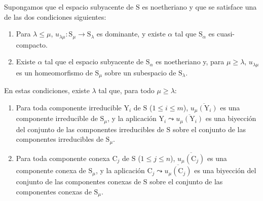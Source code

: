 \begin{proposition}[8.4.2]
\label{IV.8.4.2}
Supongamos que el espacio subyacente de $\mathrm{S}$ es noetheriano y que se satisface una de las dos condiciones siguientes:
\begin{enumerate}[label=\emph{\alph*)}]
  \item Para $\lambda\leqslant\mu$, $u_{\lambda\mu}:\mathrm{S}_\mu\to\mathrm{S}_\lambda$ es dominante, y existe $\alpha$ tal que $\mathrm{S}_\alpha$ es cuasi-compacto.
  \item Existe $\alpha$ tal que el espacio subyacente de $\mathrm{S}_\alpha$ es noetheriano y, para $\mu\geqslant\lambda$, $u_{\lambda\mu}$ es un homeomorfismo de $\mathrm{S}_\mu$ sobre un subespacio de $\mathrm{S}_\lambda$.
\end{enumerate}
En estas condiciones, existe $\lambda$ tal que, para todo $\mu\geqslant\lambda$:
\begin{enumerate}[label=(\roman*)]
  \item Para toda componente irreducible $\mathrm{Y}_i$ de $\mathrm{S}$ ($1\leqslant i\leqslant m$), $\overline{u_\mu(\mathrm{Y}_i)}$ es una componente irreducible de $\mathrm{S}_\mu$, y la aplicación $\mathrm{Y}_i\leadsto\overline{u_\mu(\mathrm{Y}_i)}$ es una biyección del conjunto de las componentes irreducibles de $\mathrm{S}$ sobre el conjunto de las componentes irreducibles de $\mathrm{S}_\mu$.
  \item Para toda componente conexa $\mathrm{C}_j$ de $\mathrm{S}$ ($1\leqslant j\leqslant n$), $\overline{u_\mu(\mathrm{C}_j)}$ es una componente conexa de $\mathrm{S}_\mu$, y la aplicación $\mathrm{C}_j\leadsto\overline{u_\mu(\mathrm{C}_j)}$ es una biyección del conjunto de las componentes conexas de $\mathrm{S}$ sobre el conjunto de las componentes conexas de $\mathrm{S}_\mu$.
\end{enumerate}
\end{proposition}

